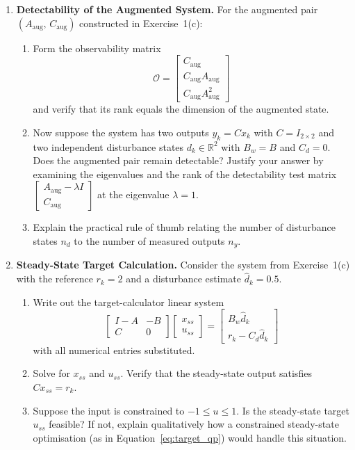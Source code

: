 \begin{enumerate}
	\item \textbf{Detectability of the Augmented System.}
	For the augmented pair \((A_{\mathrm{aug}},\, C_{\mathrm{aug}})\) constructed in Exercise~1(c):
	\begin{enumerate}
		\item Form the observability matrix
		\[
		\mathcal{O} = \begin{bmatrix} C_{\mathrm{aug}} \\ C_{\mathrm{aug}} A_{\mathrm{aug}} \\ C_{\mathrm{aug}} A_{\mathrm{aug}}^2 \end{bmatrix}
		\]
		and verify that its rank equals the dimension of the augmented state.
		\item Now suppose the system has two outputs \(y_k = C x_k\) with \(C = I_{2\times 2}\) and two independent disturbance states \(d_k \in \mathbb{R}^2\) with \(B_w = B\) and \(C_d = 0\). Does the augmented pair remain detectable? Justify your answer by examining the eigenvalues and the rank of the detectability test matrix \(\begin{bmatrix} A_{\mathrm{aug}} - \lambda I \\ C_{\mathrm{aug}} \end{bmatrix}\) at the eigenvalue \(\lambda = 1\).
		\item Explain the practical rule of thumb relating the number of disturbance states \(n_d\) to the number of measured outputs \(n_y\).
	\end{enumerate}

	\item \textbf{Steady-State Target Calculation.}
	Consider the system from Exercise~1(c) with the reference \(r_k = 2\) and a disturbance estimate \(\hat{d}_k = 0.5\).
	\begin{enumerate}
		\item Write out the target-calculator linear system
		\[
		\begin{bmatrix} I - A & -B \\ C & 0 \end{bmatrix}
		\begin{bmatrix} x_{ss} \\ u_{ss} \end{bmatrix}
		=
		\begin{bmatrix} B_w \hat{d}_k \\ r_k - C_d \hat{d}_k \end{bmatrix}
		\]
		with all numerical entries substituted.
		\item Solve for \(x_{ss}\) and \(u_{ss}\). Verify that the steady-state output satisfies \(C x_{ss} = r_k\).
		\item Suppose the input is constrained to \(-1 \le u \le 1\). Is the steady-state target \(u_{ss}\) feasible? If not, explain qualitatively how a constrained steady-state optimisation (as in Equation~\eqref{eq:target_qp}) would handle this situation.
	\end{enumerate}


\end{enumerate}
